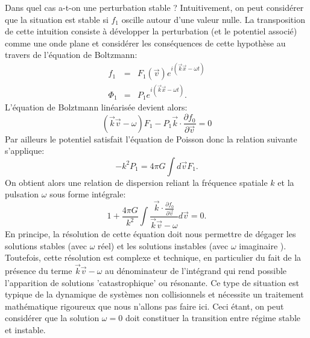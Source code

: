 Dans quel cas a-t-on une perturbation stable ? Intuitivement, on peut considérer que la situation est stable si $f_1$ oscille autour d'une valeur nulle. La transposition de cette intuition consiste à développer la perturbation (et le potentiel associé) comme une onde plane et considérer les conséquences de cette hypothèse au travers de l'équation de Boltzmann:
\begin{eqnarray}
f_1&=&F_1(\vec{v})e^{i(\vec{k}\vec{x}-\omega t)}\\
\Phi_1&=&P_1e^{i(\vec{k}\vec{x}-\omega t)}.
\end{eqnarray}
L'équation de Bolztmann linéarisée devient alors:
\begin{equation}
(\vec{k}\vec{v}-\omega )F_1-P_1\vec{k}\cdot\frac{\partial f_0}{\partial \vec{v}}=0
\end{equation}
Par ailleurs le potentiel satisfait l'équation de Poisson donc la relation suivante s'applique:
\begin{equation}
-k^2 P_1=4\pi G \int d\vec{v} F_1.
\end{equation}
On obtient alors une relation de dispersion reliant la fréquence spatiale $k$ et la pulsation $\omega$ sous forme intégrale:
\begin{equation}
1+\frac{4\pi G}{k^2}\int \frac{\vec{k}\cdot\frac{\partial f_0}{\partial \vec{v}}}{\vec{k}\vec{v}-\omega}d\vec{v}=0.
\end{equation}
En principe, la résolution de cette équation doit nous permettre de dégager les solutions stables (avec $\omega$ réel) et les solutions instables (avec $\omega$ imaginaire ). Toutefois, cette résolution est complexe et technique, en particulier du fait de la présence du terme $\vec{k}\vec{v}-\omega$ au dénominateur de l'intégrand qui rend possible l'apparition de solutions 'catastrophique' ou résonante. Ce type de situation est typique de la dynamique de systèmes non collisionnels et nécessite un traitement mathématique rigoureux que nous n'allons pas faire ici. Ceci étant, on peut considérer que la solution $\omega=0$ doit constituer la transition entre régime stable et instable.


